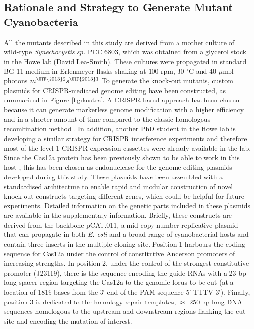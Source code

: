 \subsection{Rationale and Strategy to Generate Mutant Cyanobacteria}
All the mutants described in this study are derived from a mother culture of wild-type \textit{Synechocystis sp.} PCC 6803, which was obtained from a glycerol stock in the Howe lab (David Lea-Smith). These cultures were propagated in standard BG-11 medium in Erlenmeyer flasks shaking at 100 rpm, 30 $^{\circ}$C and 40 $\mu$mol photons $m^{\UTF{2013}2} s^{\UTF{2013}1}$
To generate the knock-out mutants, custom plasmids for CRISPR-mediated genome editing have been constructed, as summarised in Figure \ref{fig:kostra}. A CRISPR-based approach has been chosen because it can generate markerless genome modification with a higher efficiency and in a shorter amount of time compared to the classic homologous recombination method \citep{Behler2018}. In addition, another PhD student in the Howe lab is developing a similar strategy for CRISPR interference experiments and therefore most of the level 1 CRISPR expression cassettes were already available in the lab. Since the Cas12a protein has been previously shown to be able to work in this host \citep{Ungerer2016}, this has been chosen as endonuclease for the genome editing plasmids developed during this study. These plasmids have been assembled with a standardised architecture to enable rapid and modular construction of novel knock-out constructs targeting different genes, which could be helpful for future experiments. Detailed information on the genetic parts included in these plasmids are available in the supplementary information. Briefly, these constructs are derived from the backbone pCAT.011, a mid-copy number replicative plasmid that can propagate in both \textit{E. coli} and a broad range of cyanobacterial hosts and contain three inserts in the multiple cloning site. Position 1 harbours the coding sequence for Cas12a under the control of constitutive Anderson promoters  of increasing strengths. In position 2, under the control of the strongest constitutive promoter (J23119), there is the sequence encoding the guide RNAs with a 23 bp long spacer region targeting the Cas12a to the genomic locus to be cut (at a location of 1819 bases from the 3′ end of the PAM sequence 5′-TTTV-3′). Finally, position 3 is dedicated to the homology repair templates, $\approx$ 250 bp long DNA sequences homologous to the upstream and downstream regions flanking the cut site and encoding the mutation of interest.

